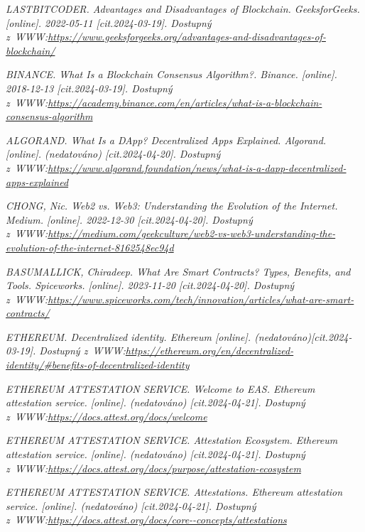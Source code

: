 \documentclass[a4paper,12pt]{article}
\begin{document}
{	
	
	\it{LASTBITCODER. Advantages and Disadvantages of Blockchain. GeeksforGeeks. [online]. 2022-05-11 }[cit.2024-03-19]. Dostupný z~WWW:\url{https://www.geeksforgeeks.org/advantages-and-disadvantages-of-blockchain/}
	
	
	\it{BINANCE. What Is a Blockchain Consensus Algorithm?. Binance. [online]. 2018-12-13 }[cit.2024-03-19]. Dostupný z~WWW:\url{https://academy.binance.com/en/articles/what-is-a-blockchain-consensus-algorithm}
	
	

	
	\it{ALGORAND. What Is a DApp? Decentralized Apps Explained. Algorand. [online]. (nedatováno) }[cit.2024-04-20]. Dostupný z~WWW:\url{https://www.algorand.foundation/news/what-is-a-dapp-decentralized-apps-explained}
	
	\it{CHONG, Nic. Web2 vs. Web3: Understanding the Evolution of the Internet. Medium.  [online]. 2022-12-30 }[cit.2024-04-20]. Dostupný z~WWW:\url{https://medium.com/geekculture/web2-vs-web3-understanding-the-evolution-of-the-internet-8162548ec94d}
	
	
	
	\it{BASUMALLICK, Chiradeep. What Are Smart Contracts? Types, Benefits, and Tools. Spiceworks.  [online]. 2023-11-20} [cit.2024-04-20]. Dostupný z~WWW:\url{https://www.spiceworks.com/tech/innovation/articles/what-are-smart-contracts/}
	
	\it{ETHEREUM. Decentralized identity. Ethereum [online]. (nedatováno)}[cit.2024-03-19]. Dostupný z~WWW:\url{https://ethereum.org/en/decentralized-identity/\#benefits-of-decentralized-identity}
	
	
	\it{ETHEREUM ATTESTATION SERVICE. Welcome to EAS. Ethereum attestation service. [online]. (nedatováno)} [cit.2024-04-21]. Dostupný z~WWW:\url{https://docs.attest.org/docs/welcome}
	
	\it{ETHEREUM ATTESTATION SERVICE. Attestation Ecosystem. Ethereum attestation service. [online]. (nedatováno)} [cit.2024-04-21]. Dostupný z~WWW:\url{https://docs.attest.org/docs/purpose/attestation-ecosystem}
	
	
	
	\it{ETHEREUM ATTESTATION SERVICE. Attestations. Ethereum attestation service. [online]. (nedatováno)} [cit.2024-04-21]. Dostupný z~WWW:\url{https://docs.attest.org/docs/core--concepts/attestations}
	
}
\end{document}
